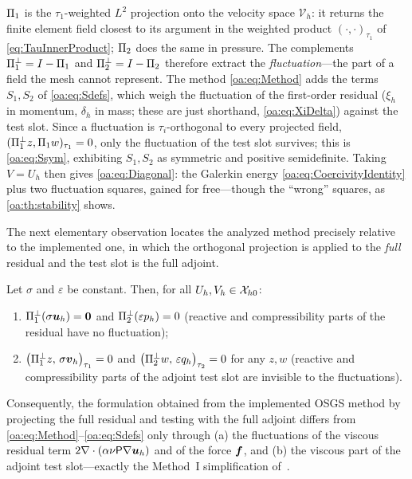 \begin{pedagogy}
$\Pi_{1}$ is the $\tau_1$-weighted $L^2$ projection onto the velocity space $\mathcal{V}_h$: it returns the finite element field closest to its argument in the weighted product $(\cdot,\cdot)_{\tau_1}$ of \cref{eq:TauInnerProduct}; $\Pi_{2}$ does the same in pressure. The complements $\Pi_{1}^{\perp} = I - \Pi_{1}$ and $\Pi_{2}^{\perp} = I - \Pi_{2}$ therefore extract the \emph{fluctuation}---the part of a field the mesh cannot represent. The method \cref{oa:eq:Method} adds the terms $S_1, S_2$ of \cref{oa:eq:Sdefs}, which weigh the fluctuation of the first-order residual ($\xi_h$ in momentum, $\delta_h$ in mass; these are just shorthand, \cref{oa:eq:XiDelta}) against the test slot. Since a fluctuation is $\tau_i$-orthogonal to every projected field, $(\Pi_{1}^{\perp} z, \Pi_{1} w)_{\tau_1} = 0$, only the fluctuation of the test slot survives; this is \cref{oa:eq:Ssym}, exhibiting $S_1, S_2$ as symmetric and positive semidefinite. Taking $V = U_h$ then gives \cref{oa:eq:Diagonal}: the Galerkin energy \cref{oa:eq:CoercivityIdentity} plus two fluctuation squares, gained for free---though the ``wrong'' squares, as \cref{oa:th:stability} shows.
\end{pedagogy}

The next elementary observation locates the analyzed method precisely relative to the
implemented one, in which the orthogonal projection is applied to the \emph{full}
residual and the test slot is the full adjoint.

\begin{lemma}
\label{oa:lem:annihilation}
Let $\sigma$ and $\varepsilon$ be constant. Then, for all $U_h, V_h \in \mathcal{X}_{h0}$:
\begin{enumerate}[label=\textup{(\roman*)}, itemsep=0.2ex]
  \item $\Pi_{1}^{\perp}(\sigma\boldsymbol{u}_h) = \boldsymbol{0}$ and $\Pi_{2}^{\perp}(\varepsilon p_h) = 0$
        (reactive and compressibility parts of the residual have no fluctuation);
  \item $\bigl( \Pi_{1}^{\perp} z,\, \sigma\boldsymbol{v}_h \bigr)_{\tau_1} = 0$ and
        $\bigl( \Pi_{2}^{\perp} w,\, \varepsilon q_h \bigr)_{\tau_2} = 0$ for any $z, w$
        (reactive and compressibility parts of the adjoint test slot are invisible to
        the fluctuations).
\end{enumerate}
Consequently, the formulation obtained from the implemented OSGS method by projecting
the full residual and testing with the full adjoint differs from
\cref{oa:eq:Method}--\cref{oa:eq:Sdefs} only through (a) the fluctuations of the viscous
residual term $2\nabla\cdot(\alpha\nu\mathsf{P}\nabla\boldsymbol{u}_h)$ and of the force $\boldsymbol{f}$,
and (b) the viscous part of the adjoint test slot---exactly the Method~I simplification
of~\cite{codina2008analysis}.
\end{lemma}


